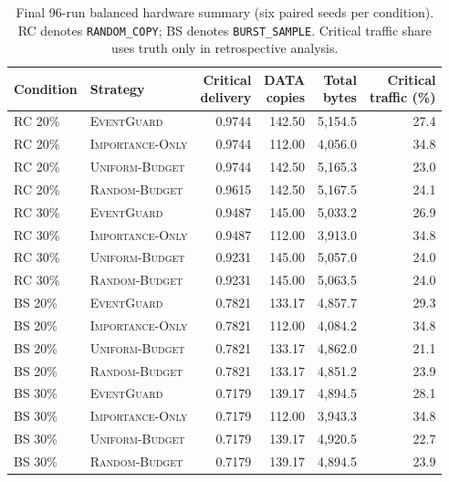\documentclass[11pt]{article}
\newcommand{\EG}{\textsc{EventGuard}}
\newcommand{\IO}{\textsc{Importance-Only}}
\newcommand{\UB}{\textsc{Uniform-Budget}}
\newcommand{\RB}{\textsc{Random-Budget}}
\begin{document}
\begin{table}[t]
\centering
\small
\caption{Final 96-run balanced hardware summary (six paired seeds per condition). RC denotes \texttt{RANDOM\_COPY}; BS denotes \texttt{BURST\_SAMPLE}. Critical traffic share uses truth only in retrospective analysis.}
\label{tab:hardware-summary}
\begin{tabular*}{\linewidth}{@{\extracolsep{\fill}}llrrrr@{}}
\toprule
Condition & Strategy & \shortstack{Critical\\delivery} & \shortstack{DATA\\copies} & \shortstack{Total\\bytes} & \shortstack{Critical\\traffic (\%)} \\
\midrule
RC 20\% & \EG{} & 0.9744 & 142.50 & 5,154.5 & 27.4 \\
RC 20\% & \IO{} & 0.9744 & 112.00 & 4,056.0 & 34.8 \\
RC 20\% & \UB{} & 0.9744 & 142.50 & 5,165.3 & 23.0 \\
RC 20\% & \RB{} & 0.9615 & 142.50 & 5,167.5 & 24.1 \\
RC 30\% & \EG{} & 0.9487 & 145.00 & 5,033.2 & 26.9 \\
RC 30\% & \IO{} & 0.9487 & 112.00 & 3,913.0 & 34.8 \\
RC 30\% & \UB{} & 0.9231 & 145.00 & 5,057.0 & 24.0 \\
RC 30\% & \RB{} & 0.9231 & 145.00 & 5,063.5 & 24.0 \\
BS 20\% & \EG{} & 0.7821 & 133.17 & 4,857.7 & 29.3 \\
BS 20\% & \IO{} & 0.7821 & 112.00 & 4,084.2 & 34.8 \\
BS 20\% & \UB{} & 0.7821 & 133.17 & 4,862.0 & 21.1 \\
BS 20\% & \RB{} & 0.7821 & 133.17 & 4,851.2 & 23.9 \\
BS 30\% & \EG{} & 0.7179 & 139.17 & 4,894.5 & 28.1 \\
BS 30\% & \IO{} & 0.7179 & 112.00 & 3,943.3 & 34.8 \\
BS 30\% & \UB{} & 0.7179 & 139.17 & 4,920.5 & 22.7 \\
BS 30\% & \RB{} & 0.7179 & 139.17 & 4,894.5 & 23.9 \\
\bottomrule
\end{tabular*}
\end{table}
\end{document}
